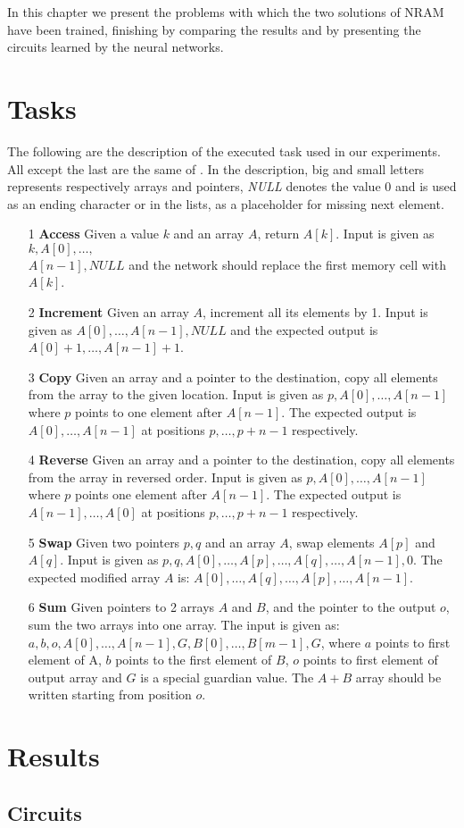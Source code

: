 \label{experiments}
In this chapter we present the problems with which the two solutions of NRAM have been trained, finishing by comparing the results and by presenting the circuits learned by the neural networks.

\section{Tasks}
The following are the description of the executed task used in our experiments. All except the last are the same of \cite{NRAM:2016}. In the description, big and small letters represents respectively arrays and pointers, \textit{NULL} denotes the value 0 and is used as an ending character or in the lists, as a placeholder for missing next element.

\begin{itemize}
	\item[1]{\textbf{Access} Given a value $k$ and an array $A$, return $A[k]$. Input is given as $k, A[0], \dots, $\\$A[n-1], \textit{NULL}$ and the network should replace the first memory cell with $A[k]$.}
	\item[2]{\textbf{Increment} Given an array $A$, increment all its elements by 1. Input is given as $A[0], \dots, A[n-1], \textit{NULL}$ and the expected output is $A[0] + 1, \dots, A[n-1] + 1$.}
	\item[3]{\textbf{Copy} Given an array and a pointer to the destination, copy all elements from the array to the given location. Input is given as $p, A[0], \dots, A[n-1]$ where $p$ points to one element after $A[n-1]$. The expected output is $A[0], \dots, A[n-1]$ at positions $p, \dots, p+n-1$ respectively.}
	\item[4]{\textbf{Reverse} Given an array and a pointer to the destination, copy all elements from the array in reversed order. Input is given as $p, A[0], \dots, A[n-1]$ where $p$ points one element after $A[n-1]$. The expected output is $A[n-1], \dots, A[0]$ at positions $p, \dots, p+n-1$ respectively.}
	\item[5]{\textbf{Swap} Given two pointers $p, q$ and an array $A$, swap elements $A[p]$ and $A[q]$. Input is given as $p, q, A[0], \dots, A[p], \dots, A[q], \dots, A[n-1], 0$. The expected modified array $A$ is: $A[0], \dots, A[q], \dots, A[p], \dots, A[n-1]$.}
	\item[6]{\textbf{Sum} Given pointers to 2 arrays $A$ and $B$, and the pointer to the output $o$, sum the two arrays into one array. The input is given as: $a, b, o, A[0], \dots, A[n-1], G, B[0], \dots, B[m-1], G$, where $a$ points to first element of A, $b$ points to the first element of $B$, $o$ points to first element of output array and $G$ is a special guardian value. The $A+B$ array should be written starting from position $o$.}
\end{itemize}

\section{Results}

\subsection{Circuits}